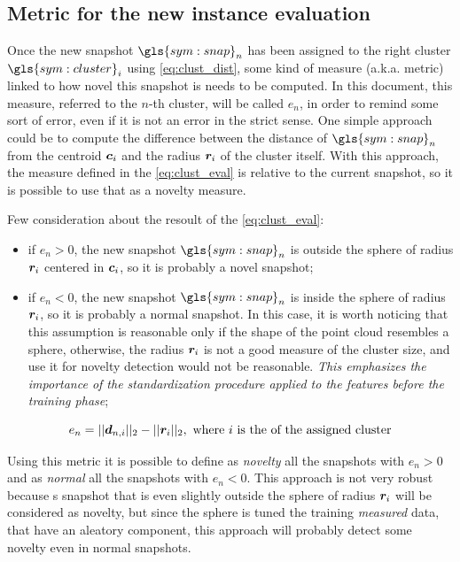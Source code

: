 \subsection{Metric for the new instance evaluation}
Once the new snapshot $\gls{sym:snap}_n$ has been assigned to the right cluster $\gls{sym:cluster}_i$ using \autoref{eq:clust_dist}, some kind of measure (a.k.a. metric) linked to how novel this snapshot is needs to be computed. In this document, this measure, referred to the $n$-th cluster, will be called $e_n$, in order to remind some sort of error, even if it is not an error in the strict sense. One simple approach could be to compute the difference between the distance of $\gls{sym:snap}_n$ from the centroid $\bm{c}_i$ and the radius $\bm{r}_i$ of the cluster itself. With this approach, the measure defined in the \autoref{eq:clust_eval} is relative to the current snapshot, so it is possible to use that as a novelty measure.

Few consideration about the resoult of the \autoref{eq:clust_eval}:
\begin{itemize}
  \item if $e_{n} > 0$, the new snapshot $\gls{sym:snap}_n$ is outside the sphere of radius $\bm{r}_i$ centered in $\bm{c}_i$, so it is probably a novel snapshot;
  \item if $e_{n} < 0$, the new snapshot $\gls{sym:snap}_n$ is inside the sphere of radius $\bm{r}_i$, so it is probably a normal snapshot. In this case, it is worth noticing that this assumption is reasonable only if the shape of the point cloud resembles a sphere, otherwise, the radius $\bm{r}_i$ is not a good measure of the cluster size, and use it for novelty detection would not be reasonable. \emph{This emphasizes the importance of the standardization procedure applied to the features before the training phase};
\end{itemize}

\begin{equation}
  \label{eq:clust_eval}
  e_{n} = ||\bm{d}_{n,i}||_2 - ||\bm{r}_{i}||_2, \text{ where $i$ is the of the assigned cluster}
\end{equation}

Using this metric it is possible to define as \emph{novelty} all the snapshots with $e_{n} > 0$ and as \emph{normal} all the snapshots with $e_{n} < 0$. This approach is not very robust because s snapshot that is even slightly outside the sphere of radius $\bm{r}_i$ will be considered as novelty, but since the sphere is tuned the training \emph{measured} data, that have an aleatory component, this approach will probably detect some novelty even in normal snapshots.

